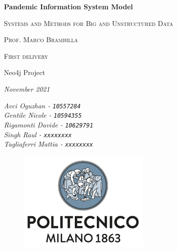 \documentclass[12pt, a4paper]{article}
\begin{document}

\begin{titlepage}
    \centering
    {\Huge\bfseries Pandemic Information System Model\par} %
    \vspace{1.5cm}
    {\scshape\large Systems and Methods for Big and Unstructured Data \par} %
    \vspace{0.5cm}
    {\scshape\large Prof. Marco Brambilla \par} %
    \vspace{1cm}
    {\scshape\large %
        First delivery \par 
        Neo4j Project \par 
    }
    \vspace{0.5cm}
    {\slshape\large November 2021 \par} %
    \vspace{1cm}
    {\large\itshape %
        Avci Oguzhan - \texttt{10557284}\\
        Gentile Nicole - \texttt{10594355}\\
        Rigamonti Davide - \texttt{10629791}\\
        Singh Raul - \texttt{xxxxxxxx}\\
        Tagliaferri Mattia - \texttt{xxxxxxxx}
    }
    \vfill
    \begin{figure}[b]
        \includegraphics[scale=0.6]{polimi.png} %
        \centering
    \end{figure}


\end{titlepage}

\end{document}
